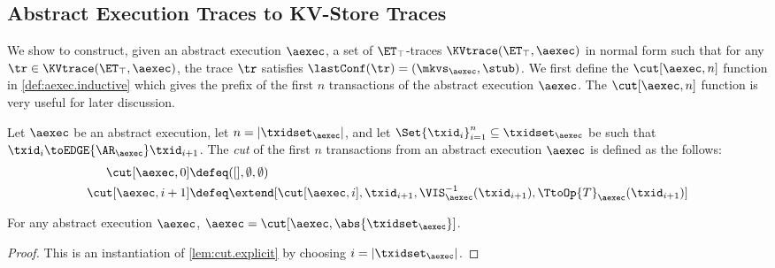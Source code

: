 \subsection{Abstract Execution Traces to KV-Store Traces}
\label{sec:aexectrace2kv}

We show to construct, given an abstract execution $\aexec$, 
a set of $\ET_{\top}$-traces $\KVtrace(\ET_{\top}, \aexec)$ in normal form such that for any 
$\tr \in \KVtrace(\ET_{\top}, \aexec)$, the trace \( \tr \) satisfies $\lastConf(\tr) = (\mkvs_{\aexec}, \stub)$. 
We first define the \( \cut[\aexec,n] \) function in \cref{def:aexec.inductive} 
which gives the prefix of the first \( n \) transactions of the abstract execution \( \aexec \).
The  \( \cut[\aexec,n] \) function is very useful for later discussion.

\begin{definition}
\label{def:aexec.inductive}
Let $\aexec$ be an abstract execution, let $n = \lvert \txidset_{\aexec} \rvert$, and let 
$\Set{\txid_{i}}_{i=1}^{n} \subseteq \txidset_{\aexec}$ be such that $\txid_{i} \toEDGE{\AR_{\aexec}} \txid_{i+1}$. 
The \emph{cut} of the first \( n \) transactions from an abstract execution \( \aexec \) is defined as the follows:
\begin{align*}
\cut[\aexec, 0] & \defeq ([], \emptyset, \emptyset)\\
\cut[\aexec , i+1] & \defeq \extend[\cut[\aexec, i], \txid_{i+1}, \VIS^{-1}_{\aexec}(\txid_{i+1}), \TtoOp{T}_{\aexec}(\txid_{i+1})]
\end{align*}
\end{definition}

\begin{proposition}
\label{prop:aexec.inductive}
For any abstract execution $\aexec$, $\aexec = \cut[\aexec, \abs{ \txidset_{\aexec} }]$.
\end{proposition}
\begin{proof}
    This is an instantiation of \cref{lem:cut.explicit} by choosing $i = \lvert \txidset_{\aexec} \rvert$. 
\end{proof}


